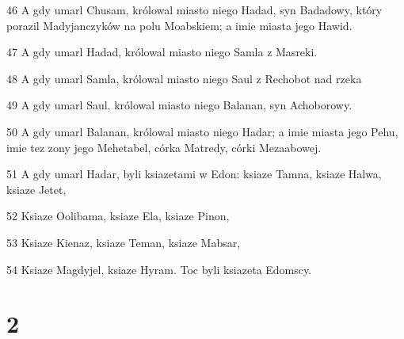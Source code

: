 \par 46 A gdy umarl Chusam, królowal miasto niego Hadad, syn Badadowy, który porazil Madyjanczyków na polu Moabskiem; a imie miasta jego Hawid.
\par 47 A gdy umarl Hadad, królowal miasto niego Samla z Masreki.
\par 48 A gdy umarl Samla, królowal miasto niego Saul z Rechobot nad rzeka
\par 49 A gdy umarl Saul, królowal miasto niego Balanan, syn Achoborowy.
\par 50 A gdy umarl Balanan, królowal miasto niego Hadar; a imie miasta jego Pehu, imie tez zony jego Mehetabel, córka Matredy, córki Mezaabowej.
\par 51 A gdy umarl Hadar, byli ksiazetami w Edon: ksiaze Tamna, ksiaze Halwa, ksiaze Jetet,
\par 52 Ksiaze Oolibama, ksiaze Ela, ksiaze Pinon,
\par 53 Ksiaze Kienaz, ksiaze Teman, ksiaze Mabsar,
\par 54 Ksiaze Magdyjel, ksiaze Hyram. Toc byli ksiazeta Edomscy.

\chapter{2}

